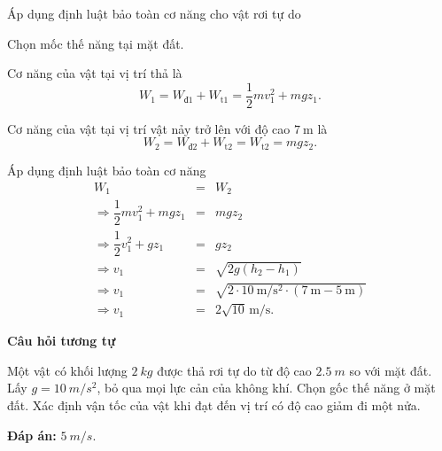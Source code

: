 \begin{dang}{Áp dụng định luật bảo toàn cơ năng cho vật rơi tự do }
{		Chọn mốc thế năng tại mặt đất.
		
		Cơ năng của vật tại vị trí thả là
		\begin{equation*}
			W_1=W_\text{đ1}+W_\text{t1}=\dfrac{1}{2}mv_1^2+mgz_1.
		\end{equation*}
		
		Cơ năng của vật tại vị trí vật nảy trở lên với độ cao $\SI{7}{\meter}$ là
		\begin{equation*}
			W_2=W_\text{đ2}+W_\text{t2}=W_\text{t2}=mgz_2.
		\end{equation*}
		
		Áp dụng định luật bảo toàn cơ năng
		\begin{eqnarray*}
			W_1&=&W_2\\
			\Rightarrow \dfrac{1}{2}mv_1^2+mgz_1 &=& mgz_2\\
			\Rightarrow \dfrac{1}{2}v_1^2+gz_1 &=& gz_2\\
			\Rightarrow v_1 &=& \sqrt{2g(h_2-h_1)}\\
			\Rightarrow v_1 &=& \sqrt{2\cdot\SI{10}{\meter/\second^2}\cdot(\SI{7}{\meter}-\SI{5}{\meter})}\\
			\Rightarrow v_1 &=& 2\sqrt{10}\,\text{m/s}.
		\end{eqnarray*}
		
		\begin{center}
			\textbf{Câu hỏi tương tự}
		\end{center}
		
		Một vật có khối lượng $\SI{2}{kg}$ được thả rơi tự do từ độ cao $\SI{2.5}{m}$ so với mặt đất. Lấy $g=\SI{10}{m/s^2}$, bỏ qua mọi lực cản của không khí. Chọn gốc thế năng ở mặt đất. Xác định vận tốc của vật khi đạt đến vị trí có độ cao giảm đi một nửa.
		
		\textbf{Đáp án: } $\SI{5}{m/s}$.
	}
\end{dang}

